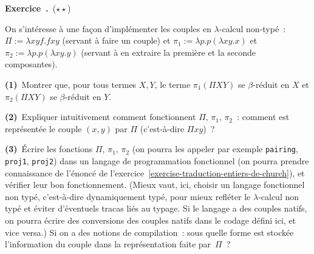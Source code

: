 \documentclass[12pt,a4paper]{article}
\theoremstyle{definition}
\newcommand\exercice{%
\refstepcounter{comcnt}\bigskip\noindent\textbf{Exercice~\thecomcnt.}}
\begin{document}
%

\exercice\label{exercise-coding-of-pairs-untyped}\ (${\star}{\star}$)\par\nobreak

On s'intéresse à une façon d'implémenter les couples en
$\lambda$-calcul non-typé : $\Pi := \lambda xyf.fxy$ (servant à faire
un couple) et $\pi_1 := \lambda p.p(\lambda xy.x)$ et $\pi_2 :=
\lambda p.p(\lambda xy.y)$ (servant à en extraire la première et la
seconde composantes).

\textbf{(1)} Montrer que, pour tous termes $X,Y$, le terme $\pi_1(\Pi
XY)$ se $\beta$-réduit en $X$ et $\pi_2(\Pi XY)$ se $\beta$-réduit en
$Y$.

\textbf{(2)} Expliquer intuitivement comment fonctionnent $\Pi$,
$\pi_1$, $\pi_2$ : comment est représentée le couple $(x,y)$ par $\Pi$
(c'est-à-dire $\Pi xy$) ?

\textbf{(3)} Écrire les fonctions $\Pi$, $\pi_1$, $\pi_2$ (on pourra
les appeler par exemple \texttt{pairing}, \texttt{proj1},
\texttt{proj2}) dans un langage de programmation fonctionnel (on
pourra prendre connaissance de l'énoncé de
l'exercice \ref{exercise-traduction-entiers-de-church}), et vérifier
leur bon fonctionnement.  (Mieux vaut, ici, choisir un langage
fonctionnel non typé, c'est-à-dire dynamiquement typé, pour mieux
refléter le $\lambda$-calcul non typé et éviter d'éventuels tracas
liés au typage.  Si le langage a des couples natifs, on pourra écrire
des conversions des couples natifs dans le codage défini ici, et vice
versa.)  Si on a des notions de compilation : sous quelle forme est
stockée l'information du couple dans la représentation faite
par $\Pi$ ?
\end{document}
